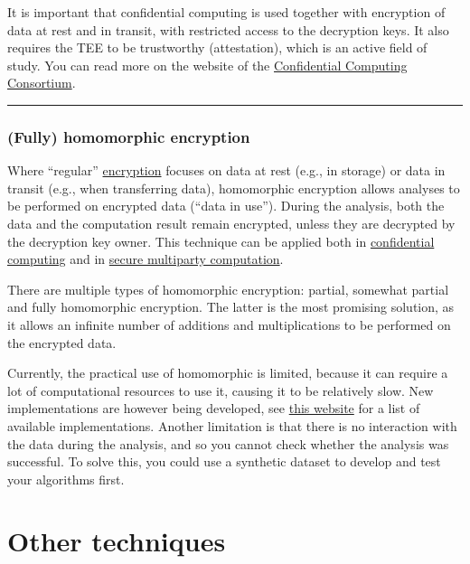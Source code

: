 \documentclass[
]{book}
\begin{document}
It is important that confidential computing is used together with encryption of
data at rest and in transit, with restricted access to the decryption keys. It
also requires the TEE to be trustworthy (attestation), which is an active field
of study. You can read more on the website of the
\href{https://confidentialcomputing.io/}{Confidential Computing Consortium}.

\begin{center}\rule{0.5\linewidth}{0.5pt}\end{center}

\hypertarget{homomorphic-encryption}{%
\subsection{(Fully) homomorphic encryption}\label{homomorphic-encryption}}

Where ``regular'' \protect\hyperlink{encryption}{encryption} focuses on data at rest (e.g., in
storage) or data in transit (e.g., when transferring data), homomorphic
encryption allows analyses to be performed on encrypted data (``data in use'').
During the analysis, both the data and the computation result remain encrypted,
unless they are decrypted by the decryption key owner. This technique can be
applied both in \protect\hyperlink{confidential-computing}{confidential computing} and in
\protect\hyperlink{mpc}{secure multiparty computation}.

There are multiple types of homomorphic encryption: partial, somewhat partial
and fully homomorphic encryption. The latter is the most promising solution, as
it allows an infinite number of additions and multiplications to be performed on
the encrypted data.

Currently, the practical use of homomorphic is limited, because it can require
a lot of computational resources to use it, causing it to be relatively slow.
New implementations are however being developed, see
\href{https://homomorphicencryption.org/introduction/}{this website}
for a list of available implementations. Another limitation is that there is no
interaction with the data during the analysis, and so you cannot check whether
the analysis was successful. To solve this, you could use a synthetic dataset
to develop and test your algorithms first.

\hypertarget{other-techniques}{%
\chapter{Other techniques}\label{other-techniques}}
\end{document}
